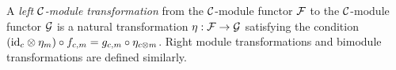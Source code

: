 \documentclass{amsart}
\begin{document}
\begin{definition}
A \emph{left $\mathcal C$-module transformation} from the $\mathcal C$-module functor $\mathcal F$ to the $\mathcal C$-module functor $\mathcal G$ is a natural transformation $\eta: \mathcal F \rightarrow \mathcal G$ satisfying the condition $(\mathrm{id}_c \otimes \eta_m) \circ f_{c,m} = g_{c,m} \circ \eta_{c \otimes m}$.  Right module transformations and bimodule transformations are defined similarly.
\end{definition}


%
%	
%	
\end{document}
